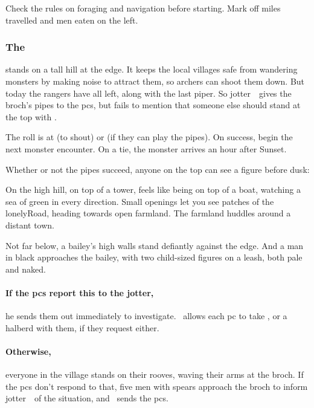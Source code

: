 \documentclass[10pt,twoside]{book}
\begin{document}
Check the rules on \gls{foraging} and \gls{navigation} before starting.
Mark off miles travelled and men eaten on the left.

\subsubsection{The }
stands on a tall hill at the \gls{edge}.
It keeps the local \glspl{village} safe from wandering \glspl{monster} by making noise to attract them, so  archers can shoot them down.
But today the \glspl{ranger} have all left, along with the last piper.
So \Gls{jotter}~\fjot\ gives the \gls{broch}'s pipes to the \glspl{pc}, but fails to mention that someone else should stand at the top with .

The roll is  at \tn[12] (to shout) or \tn[9] (if they can play the pipes).
On success, begin the next \gls{monster} encounter.
On a tie, the \gls{monster} arrives an hour after Sunset.

Whether or not the pipes succeed, anyone on the top can see a figure before dusk:

\begin{boxtext}
  On the high hill, on top of a tower, feels like being on top of a boat, watching a  sea of green in every direction.
  Small openings let you see patches of the \gls{lonelyRoad}, heading towards open farmland.
  The farmland huddles around a distant town.
  
  Not far below, a bailey's high walls stand defiantly against the \gls{edge}.
  And a man in black approaches the bailey, with two child-sized figures on a leash, both pale and naked.
\end{boxtext}

\paragraph{If the \glspl{pc} report this to the \gls{jotter},}
he sends them out immediately to investigate.
\fjot\ allows each \gls{pc} to take \rations, or a halberd with them, if they request either.

\paragraph{Otherwise,}
everyone in the \gls{village} stands on their rooves, waving their arms at the \gls{broch}.
If the \glspl{pc} don't respond to that, five men with spears approach the \gls{broch} to inform \Gls{jotter}~\fjot\ of the situation, and \fjot\ sends the \glspl{pc}.
\end{document}
